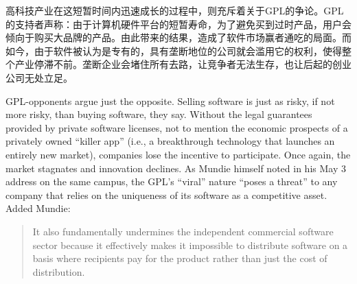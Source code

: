 \ifdefined\chs
高科技产业在这短暂时间内迅速成长的过程中，则充斥着关于GPL的争论。GPL的支持者声称：由于计算机硬件平台的短暂寿命，为了避免买到过时产品，用户会倾向于购买大品牌的产品。由此带来的结果，造成了软件市场赢者通吃的局面。而如今，由于软件被认为是专有的，具有垄断地位的公司就会滥用它的权利，使得整个产业停滞不前。垄断企业会堵住所有去路，让竞争者无法生存，也让后起的创业公司无处立足。
\fi

\ifdefined\eng
GPL-opponents argue just the opposite. Selling software is just as risky, if not more risky, than buying software, they say. Without the legal guarantees provided by private software licenses, not to mention the economic prospects of a privately owned ``killer app'' (i.e., a breakthrough technology that launches an entirely new market), companies lose the incentive to participate. Once again, the market stagnates and innovation declines. As Mundie himself noted in his May 3 address on the same campus, the GPL's ``viral'' nature ``poses a threat'' to any company that relies on the uniqueness of its software as a competitive asset. Added Mundie:
\begin{quote}
It also fundamentally undermines the independent commercial software sector because it effectively makes it impossible to distribute software on a basis where recipients pay for the product rather than just the cost of distribution.
\end{quote}

